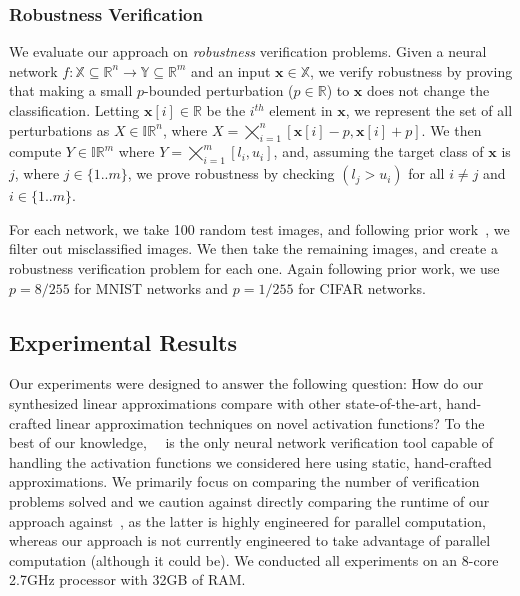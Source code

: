 \subsubsection{Robustness Verification}
We evaluate our approach on \textit{robustness} verification problems. Given a
neural network $ f: \mathbb{X} \subseteq \mathbb{R}^n \to \mathbb{Y} \subseteq
\mathbb{R}^m $ and an input $ \mathbf{x} \in \mathbb{X} $, we verify robustness
by proving that making a small $ p $-bounded perturbation ($ p \in \mathbb{R}
$) to $ \mathbf{x} $ does not change the classification. Letting $
\mathbf{x}[i] \in \mathbb{R} $ be the $ i^{th} $ element in $ \mathbf{x} $, we
represent the set of all perturbations as $ X \in \mathbb{IR}^n $, where $ X =
\bigtimes_{i=1}^n [\mathbf{x}[i] - p, \mathbf{x}[i] + p] $. We then compute $ Y
\in \mathbb{IR}^m $ where $ Y = \bigtimes_{i=1}^m [l_i,
u_i] $, and, assuming the target class of $ \mathbf{x} $ is $ j $, where $ j \in
\{1..m\} $, we prove robustness by checking $ (l_j > u_i)$ for all $i \neq j$ and $i \in
\{1..m\} $.

For each network, we take 100 random test images, and following prior
work~\cite{GehrMDTCV18}, we filter out misclassified images. We then take
the remaining images, and create a robustness verification problem for each
one. Again following prior work, we use $ p = 8/255 $ for MNIST networks
and $ p = 1/255 $ for CIFAR networks.

\subsection{Experimental Results}

Our experiments were designed to answer the following question: How do our
synthesized linear approximations compare with other state-of-the-art,
hand-crafted linear approximation techniques on novel activation functions?
%
To the best of our
knowledge,~\autolipra{}~\cite{autolipra} is the only neural network
verification tool capable of handling the activation functions we considered here
using static, hand-crafted approximations.
%
We primarily focus on comparing the number of verification problems solved
%
and we caution against directly comparing the runtime of our approach
against~\autolipra{}, as the latter is highly engineered for parallel computation,
whereas our approach is not currently engineered to take advantage of parallel computation (although it
could be).
%
We conducted all experiments on an 8-core 2.7GHz processor with 32GB of RAM.
%


